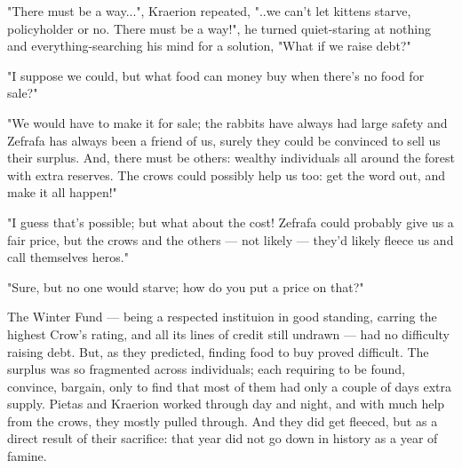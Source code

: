 
"There must be a way...", Kraerion repeated, "..we can't let kittens starve, policyholder or no. There must be a way!", he turned quiet-staring at nothing and everything-searching his mind for a solution, "What if we raise debt?"





"I suppose we could, but what food can money buy when there's no food for sale?"

"We would have to make it for sale; the rabbits have always had large safety and Zefrafa has always been a friend of us, surely they could be convinced to sell us their surplus. And, there must be others: wealthy individuals all around the forest with extra reserves. The crows could possibly help us too: get the word out, and make it all happen!"

"I guess that's possible; but what about the cost! Zefrafa could probably give us a fair price, but the crows and the others — not likely — they'd likely fleece us and call themselves heros."

"Sure, but no one would starve; how do you put a price on that?"


The Winter Fund — being a respected instituion in good standing, carring the highest Crow's rating, and all its lines of credit still undrawn — had no difficulty raising debt. But, as they predicted, finding food to buy proved difficult. The surplus was so fragmented across individuals; each requiring to be found, convince, bargain, only to find that most of them had only a couple of days extra supply. Pietas and Kraerion worked through day and night, and with much help from the crows, they mostly pulled through. And they did get fleeced, but as a direct result of their sacrifice: that year did not go down in history as a year of famine.


